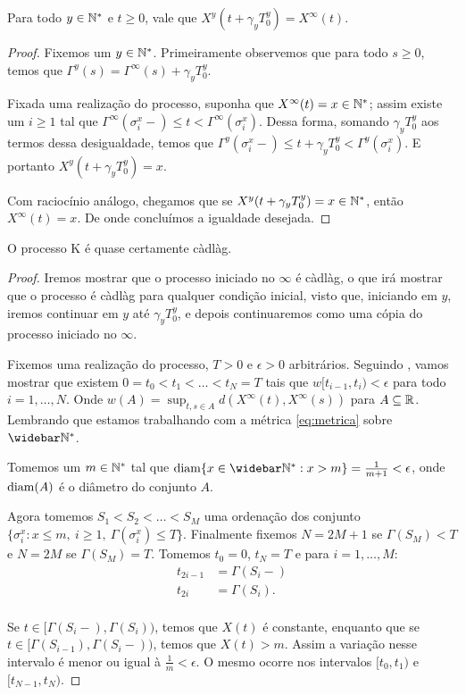 \begin{proposicao}
  \label{prop:reinicia-infinito}
  Para todo $y \in {\mathbb{N^*}}$ e $t \geq 0$, vale que
  $X^y(t + \gamma_y T_0^y) = X^\infty(t)$.
\end{proposicao}
\begin{proof}
  Fixemos um $y \in {\mathbb{N^*}}$. Primeiramente observemos que para todo $s
  \geq 0$, temos que $\Gamma^y(s) = \Gamma^\infty(s) + \gamma_yT^y_0$.

  Fixada uma realização do processo, suponha que $X^\infty(t) = x \in
  {\mathbb{N^*}}$; assim existe um $i \geq 1$ tal que $\Gamma^\infty(\sigma_i^x-)
  \leq t < \Gamma^\infty(\sigma_i^x)$. Dessa forma, somando $\gamma_y
  T^y_0$ aos termos dessa desigualdade, temos que
  $\Gamma^y(\sigma_i^x-) \leq t+\gamma_yT_0^y <
  \Gamma^y(\sigma_i^x)$. E portanto $X^y(t+\gamma_y T_0^y) = x$.

  Com raciocínio análogo, chegamos que se $X^y(t+\gamma_y T_0^y) = x
  \in {\mathbb{N^*}}$, então $X^\infty(t) = x$. De onde concluímos a igualdade
  desejada.
\end{proof}


\begin{proposicao}
  \label{prop:proc-cadlag}
  O processo K é quase certamente càdlàg.
\end{proposicao}
\begin{proof}

  Iremos mostrar que o processo iniciado no $\infty$ é càdlàg, o que
  irá mostrar que o processo é càdlàg para qualquer condição inicial,
  visto que, iniciando em $y$, iremos continuar em $y$ até $\gamma_y
  T^y_0$, e depois continuaremos como uma cópia do processo iniciado
  no $\infty$.

  Fixemos uma realização do processo, $T > 0$ e $\epsilon > 0$
  arbitrários. Seguindo \cite{billingsley:99}, vamos mostrar que
  existem $0 = t_0 < t_1 < \ldots < t_N = T$ tais que $w[t_{i-1}, t_i)
  < \epsilon$ para todo $i = 1, \ldots, N$. Onde $w(A) = \sup_{t, s
    \in A} d(X^\infty(t), X^\infty(s))$ para $A \subseteq
  {\mathbb{R}}$. Lembrando que estamos trabalhando com a métrica
  \eqref{eq:metrica} sobre $\Nzb$.

  Tomemos um $m \in {\mathbb{N^*}}$ tal que $\diam\{x \in \Nzb: x > m \} =
  \frac{1}{m+1} < \epsilon$, onde ${\mathrm{diam}}(A)$ é o diâmetro do conjunto
  $A$.

  Agora tomemos $S_1 < S_2 < \ldots < S_M$ uma ordenação dos conjunto $\{
  \sigma^x_i: x \leq m, \: i \geq 1, \: \Gamma(\sigma^x_i) \leq
  T\}$. Finalmente fixemos $N = 2M+1$ se $\Gamma(S_M) < T$ e $N = 2M$
  se $\Gamma(S_M) = T$. Tomemos $t_0 = 0$, $t_N = T$ e para $i=1,\ldots, M$:
  \begin{align*}
    t_{2i-1} &= \Gamma(S_i-)\\
    t_{2i} &= \Gamma(S_i).\\
  \end{align*}

  Se $t \in [\Gamma(S_i-), \Gamma(S_i))$, temos que $X(t)$ é
  constante, enquanto que se $t \in [\Gamma(S_{i-1}),
  \Gamma(S_{i}-))$, temos que $X(t) > m$. Assim a variação nesse
  intervalo é menor ou igual à $\frac{1}{m} < \epsilon$. O mesmo
  ocorre nos intervalos $[t_0, t_1)$ e $[t_{N-1}, t_N)$.
\end{proof}

